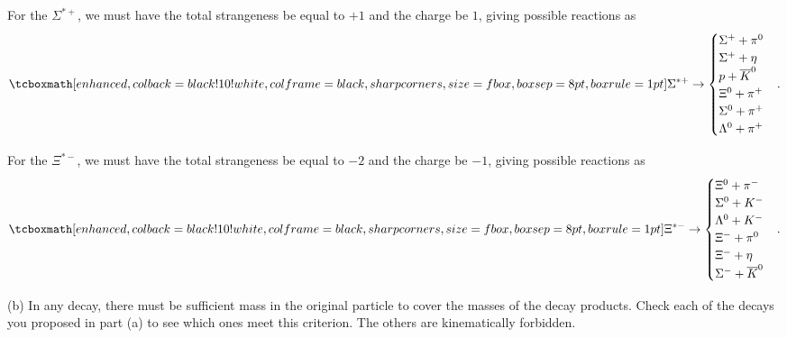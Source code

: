 For the $\Sigma^{*+}$, we must have the total strangeness be equal to $+1$ and the charge be $1$, giving possible reactions as
\begin{eqnarray}
    \label{eq:decay-modes-sig_star_plus}
    \eqbox{
    \Sigma^{*+} \rightarrow 
    \begin{cases}
    \Sigma^{+} + \pi^{0} \\
    \Sigma^{+} + \eta \\
    p + \overline{K}^{0} \\
    \Xi^{0} + \pi^{+} \\
    \Sigma^{0} + \pi^{+} \\
    \Lambda^{0} + \pi^{+}
    \end{cases}
    }    
.\end{eqnarray}

For the $\Xi^{*-}$, we must have the total strangeness be equal to $-2$ and the charge be $-1$, giving possible reactions as 
\begin{eqnarray}
    \label{eq:decay-modes-Xi_star_minus}
    \eqbox{
    \Xi^{*-} \rightarrow 
    \begin{cases}
    \Xi^{0} + \pi^{-} \\
    \Sigma^{0} + K^{-} \\
    \Lambda^{0} + K^{-} \\
    \Xi^{-} + \pi^{0} \\
    \Xi^{-} + \eta \\
    \Sigma^{-} + \overline{K}^{0}
    \end{cases}
}
.\end{eqnarray}


(b) In any decay, there must be sufficient mass in the original particle to cover the masses of the decay products.
Check each of the decays you proposed in part (a) to see which ones meet this criterion.
The others are kinematically forbidden.

